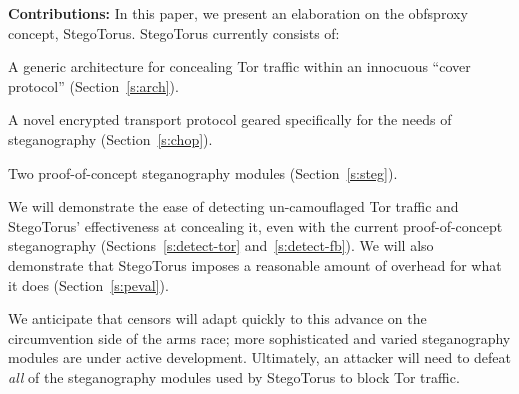 \smallskip\noindent\textbf{Contributions:} In this paper, we present
an elaboration on the obfsproxy concept, StegoTorus.  StegoTorus
currently consists of:
\begin{compactitem}
\item A generic architecture for concealing Tor traffic within an
  innocuous “cover protocol” (Section~\ref{s:arch}).
\item A novel encrypted transport protocol geared specifically for the
  needs of steganography (Section~\ref{s:chop}).
\item Two proof-of-concept steganography modules (Section~\ref{s:steg}).
\end{compactitem}
We will demonstrate the ease of detecting un-camouflaged Tor traffic
and StegoTorus' effectiveness at concealing it, even with the current
proof-of-concept steganography (Sections~\ref{s:detect-tor}
and~\ref{s:detect-fb}).  We will also demonstrate that StegoTorus
imposes a reasonable amount of overhead for what it does
(Section~\ref{s:peval}).

We anticipate that censors will adapt quickly to this advance on the
circumvention side of the arms race; more sophisticated and varied
steganography modules are under active development.  Ultimately, an
attacker will need to defeat \emph{all} of the steganography modules
used by StegoTorus to block Tor traffic.
